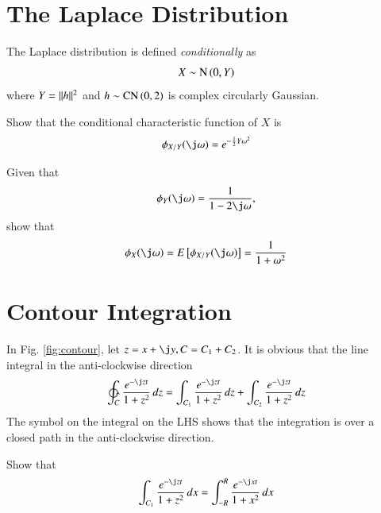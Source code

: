 \documentclass[journal,12pt,twocolumn]{IEEEtran}
\begin{document}
\section{The Laplace Distribution}
\begin{definition}
The Laplace distribution is defined {\em conditionally} as
\begin{equation}
 X \sim {\textrm {N}}\left(0 ,Y\right)
\end{equation}
where $Y = \lVert h\rVert^2$ and $h \sim \textrm {CN}\left(0,2\right)$ is complex circularly Gaussian.
\end{definition}
\begin{problem}
Show that the conditional characteristic function of $X$ is
\begin{equation}
\phi_{X/Y}(\j\omega) = e^{-\frac{1}{2}Y\omega^2}
\end{equation}
\end{problem}
\begin{problem}
Given that 
\begin{equation}
\phi_{Y}(\j\omega)  = \frac{1}{1-2\j\omega},
\end{equation}
show that
\begin{equation}
\phi_X(\j\omega) = E\sbrak{\phi_{X/Y}(\j\omega)} = \frac{1}{1+\omega^2}
\end{equation}
\end{problem}
\section{Contour Integration}
%
In Fig. \ref{fig:contour}, let $z = x + \j y, C = C_1+C_2$. It is obvious that the line integral in the anti-clockwise direction
\begin{equation}
\ointctrclockwise_C \frac{e^{-\j zt}}{1+z^2}\,dz = \int_{C_1} \frac{e^{-\j z t}}{1+z^2}\,dz + \int_{C_2} \frac{e^{-\j zt}}{1+z^2}\,dz
\end{equation}
%
The symbol on the integral on the LHS shows that the integration is over a closed path in the anti-clockwise direction.
\begin{problem}
Show that
\begin{equation}
\int_{C_1} \frac{e^{-\j z t}}{1+z^2}\,dx = \int_{-R}^{R} \frac{e^{-\j x t}}{1+x^2}\,dx
\end{equation}
\end{problem}
\end{document}
